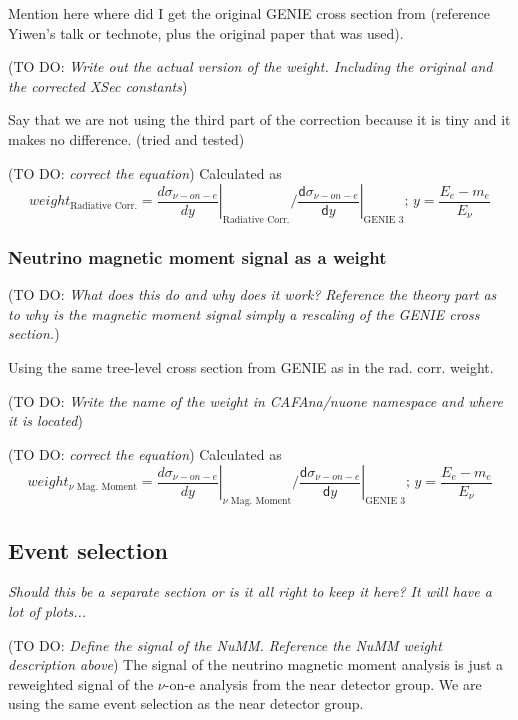 \documentclass[12pt]{article}
\newcommand{\todo }[1]{({\color{red}\sc TO DO: \textit{#1}})}
\begin{document}
Mention here where did I get the original GENIE cross section from (reference Yiwen's talk or technote, plus the original paper that was used).

\todo{Write out the actual version of the weight. Including the original and the corrected XSec constants}

Say that we are not using the third part of the correction because it is tiny and it makes no difference. (tried and tested)

\todo{correct the equation}
Calculated as 
\begin{equation}
weight_{\text{Radiative Corr.}} = \left.\frac{d\sigma_{\nu-on-e}}{dy}\right|_{\text{Radiative Corr.}} / \left.\frac{\textsf{d}\sigma_{\nu-on-e}}{\textsf{d}y}\right|_{\text{GENIE 3}};\,y=\frac{E_e-m_e}{E_\nu}
\end{equation}

\subsubsection{Neutrino magnetic moment signal as a weight}
\todo{What does this do and why does it work? Reference the theory part as to why is the magnetic moment signal simply a rescaling of the GENIE cross section.}

Using the same tree-level cross section from GENIE as in the rad. corr. weight.

\todo{Write the name of the weight in CAFAna/nuone namespace and where it is located}

\todo{correct the equation}
Calculated as 
\begin{equation}
weight_{\nu\text{ Mag. Moment}} = \left.\frac{d\sigma_{\nu-on-e}}{dy}\right|_{\nu\text{ Mag. Moment}} / \left.\frac{\textsf{d}\sigma_{\nu-on-e}}{\textsf{d}y}\right|_{\text{GENIE 3}};\,y=\frac{E_e-m_e}{E_\nu}
\end{equation}

\subsection{Event selection}
\textit{Should this be a separate section or is it all right to keep it here? It will have a lot of plots...}

\todo{Define the signal of the NuMM. Reference the NuMM weight description above}
The signal of the neutrino magnetic moment analysis is just a reweighted signal of the $\nu$-on-e analysis from the near detector group. We are using the same event selection as the near detector group.
\end{document}
